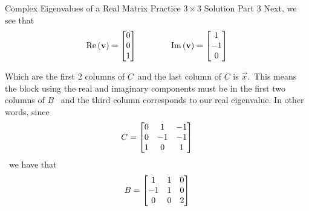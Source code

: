 \documentclass[xcoler=dvipsnames, aspectratio=169]{beamer}
\renewcommand{\Re}[1]{\textrm{Re}\left(#1\right)}
\renewcommand{\Im}[1]{\textrm{Im}\left(#1\right)}
\begin{document}
    \begin{frame}{Complex Eigenvalues of a Real Matrix Practice $3\times 3$ Solution Part 3}
        \small
        Next, we see that
        \[
            \Re{\vec{v}} = \bMat{0\\0\\1}\qquad\qquad\Im{\vec{v}} = \bMat{1\\-1\\0}
        \]\pause

        Which are the first $2$ columns of $C$\pause\ and the last column of $C$ is $\vec{x}$.\pause\
        This means the block using the real and imaginary components must be in the first two columns of $B$
        \pause\ and the third column corresponds to our real eigenvalue. In other words, since
        \[
            C = \begin{bmatrix}
                0 & 1 & -1\\
                0 & -1& -1\\
                1 & 0 & 1
            \end{bmatrix}
        \]\pause\ we have that
        \[
            B = \begin{bmatrix}
                1 & 1 & 0\\
                -1 & 1 & 0\\
                0 & 0 & 2
            \end{bmatrix}
        \]
    \end{frame}
\end{document}
